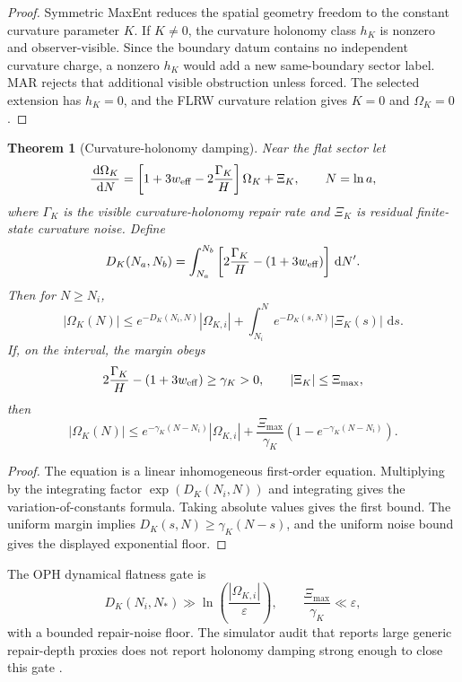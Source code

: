 \documentclass[11pt]{article}
\newtheorem{theorem}{Theorem}[section]
\newcommand{\dd}{\,\mathrm d}
\begin{document}
\begin{proof}
Symmetric MaxEnt reduces the spatial geometry freedom to the constant curvature parameter \(K\). If
\(K\ne0\), the curvature holonomy class \(h_K\) is nonzero and observer-visible. Since the boundary
datum contains no independent curvature charge, a nonzero \(h_K\) would add a new same-boundary
sector label. MAR rejects that additional visible obstruction unless forced. The selected extension
has \(h_K=0\), and the FLRW curvature relation gives \(K=0\) and \(\Omega_K=0\).
\end{proof}

\begin{theorem}[Curvature-holonomy damping]\label{thm:curvature-damping}
Near the flat sector let
\[
\frac{\dd\Omega_K}{\dd N}
=
\left[
1+3w_{\rm eff}
-2\frac{\Gamma_K}{H}
\right]\Omega_K
+\Xi_K,
\qquad
N=\ln a,
\]
where \(\Gamma_K\) is the visible curvature-holonomy repair rate and \(\Xi_K\) is residual
finite-state curvature noise. Define
\[
D_K(N_a,N_b)
=
\int_{N_a}^{N_b}
\left[
2\frac{\Gamma_K}{H}-(1+3w_{\rm eff})
\right]\dd N' .
\]
Then for \(N\ge N_i\),
\[
|\Omega_K(N)|
\le
e^{-D_K(N_i,N)}|\Omega_{K,i}|
+
\int_{N_i}^{N}e^{-D_K(s,N)}|\Xi_K(s)|\,\dd s .
\]
If, on the interval, the margin obeys
\[
2\frac{\Gamma_K}{H}-(1+3w_{\rm eff})\ge\gamma_K>0,
\qquad
|\Xi_K|\le\Xi_{\max},
\]
then
\[
|\Omega_K(N)|
\le
e^{-\gamma_K(N-N_i)}|\Omega_{K,i}|
+
\frac{\Xi_{\max}}{\gamma_K}\left(1-e^{-\gamma_K(N-N_i)}\right).
\]
\end{theorem}

\begin{proof}
The equation is a linear inhomogeneous first-order equation. Multiplying by the integrating factor
\(\exp(D_K(N_i,N))\) and integrating gives the variation-of-constants formula. Taking absolute
values gives the first bound. The uniform margin implies
\(D_K(s,N)\ge\gamma_K(N-s)\), and the uniform noise bound gives the displayed exponential floor.
\end{proof}

The OPH dynamical flatness gate is
\[
D_K(N_i,N_\ast)
\gg
\ln\left(\frac{|\Omega_{K,i}|}{\varepsilon}\right),
\qquad
\frac{\Xi_{\max}}{\gamma_K}\ll\varepsilon,
\]
with a bounded repair-noise floor. The simulator audit that reports large generic repair-depth
proxies does not report holonomy damping strong enough to close this gate \cite{ophsim}.
\end{document}
